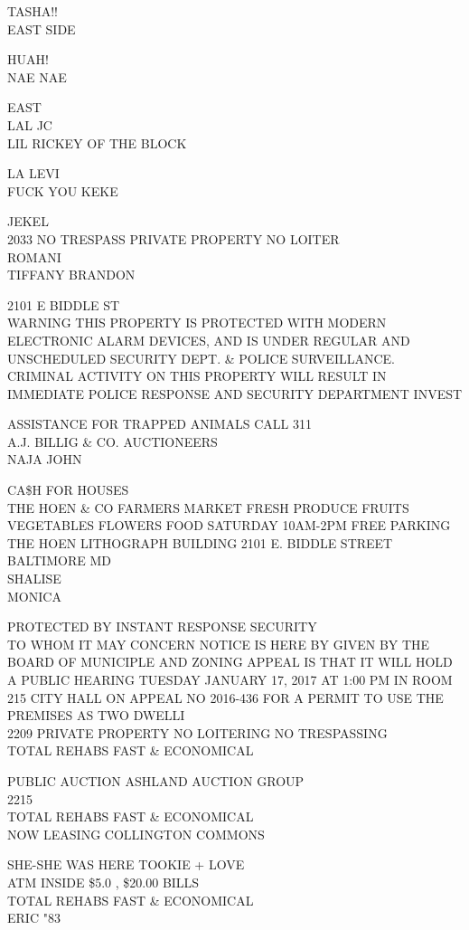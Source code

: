 \documentclass[10pt,letterpaper]{article}
\begin{document}
TASHA!!\\
EAST SIDE

HUAH!\\
NAE NAE

EAST\\
LAL JC\\
LIL RICKEY OF THE BLOCK

LA LEVI\\
FUCK YOU KEKE

JEKEL\\
2033 NO TRESPASS PRIVATE PROPERTY NO LOITER\\
ROMANI\\
TIFFANY BRANDON

2101 E BIDDLE ST\\
WARNING THIS PROPERTY IS PROTECTED WITH MODERN ELECTRONIC ALARM DEVICES, AND IS UNDER REGULAR AND UNSCHEDULED SECURITY DEPT. \& POLICE SURVEILLANCE.  CRIMINAL ACTIVITY ON THIS PROPERTY WILL RESULT IN IMMEDIATE POLICE RESPONSE AND SECURITY DEPARTMENT INVEST

ASSISTANCE FOR TRAPPED ANIMALS CALL 311\\
A.J. BILLIG \& CO. AUCTIONEERS\\
NAJA JOHN

CA\$H FOR HOUSES\\
THE HOEN \& CO FARMERS MARKET  FRESH PRODUCE FRUITS VEGETABLES FLOWERS FOOD SATURDAY 10AM{-}2PM FREE PARKING THE HOEN LITHOGRAPH BUILDING 2101 E. BIDDLE STREET BALTIMORE MD\\
SHALISE\\
MONICA

PROTECTED BY INSTANT RESPONSE SECURITY\\
TO WHOM IT MAY CONCERN NOTICE IS HERE BY GIVEN BY THE BOARD OF MUNICIPLE AND ZONING APPEAL IS THAT IT WILL HOLD A PUBLIC HEARING TUESDAY JANUARY 17, 2017 AT 1:00 PM IN ROOM 215 CITY HALL ON APPEAL NO 2016{-}436 FOR A PERMIT TO USE THE PREMISES AS TWO DWELLI\\
2209 PRIVATE PROPERTY NO LOITERING NO TRESPASSING\\
TOTAL REHABS FAST \& ECONOMICAL

PUBLIC AUCTION ASHLAND AUCTION GROUP\\
2215\\
TOTAL REHABS FAST \& ECONOMICAL\\
NOW LEASING COLLINGTON COMMONS

SHE{-}SHE WAS HERE TOOKIE + LOVE\\
ATM INSIDE \$5.0 , \$20.00 BILLS\\
TOTAL REHABS FAST \& ECONOMICAL\\
ERIC "83
\end{document}

